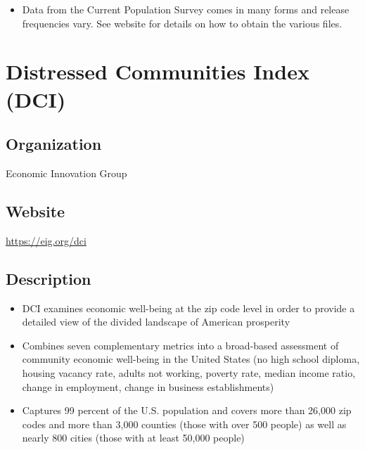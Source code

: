 \documentclass[
]{book}
\providecommand{\tightlist}{%
  \setlength{\itemsep}{0pt}\setlength{\parskip}{0pt}}
\begin{document}
\begin{itemize}
\tightlist
\item
  Data from the Current Population Survey comes in many forms and release frequencies vary. See website for details on how to obtain the various files.
\end{itemize}

\mainmatter

\hypertarget{distressed-communities-index-dci}{%
\chapter{Distressed Communities Index (DCI)}\label{distressed-communities-index-dci}}

\hypertarget{organization-22}{%
\section{Organization}\label{organization-22}}

Economic Innovation Group

\hypertarget{website-22}{%
\section{Website}\label{website-22}}

\url{https://eig.org/dci}

\hypertarget{description-22}{%
\section{Description}\label{description-22}}

\begin{itemize}
\tightlist
\item
  DCI examines economic well-being at the zip code level in order to provide a detailed view of the divided landscape of American prosperity
\item
  Combines seven complementary metrics into a broad-based assessment of community economic well-being in the United States (no high school diploma, housing vacancy rate, adults not working, poverty rate, median income ratio, change in employment, change in business establishments)
\item
  Captures 99 percent of the U.S. population and covers more than 26,000 zip codes and more than 3,000 counties (those with over 500 people) as well as nearly 800 cities (those with at least 50,000 people)
\end{itemize}
\end{document}
